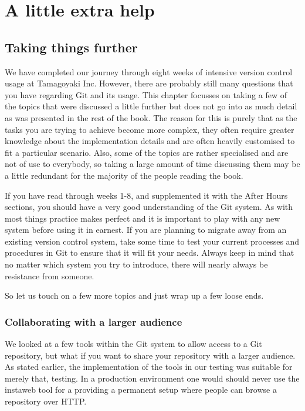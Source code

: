 \cleardoublepage
\chapter{A little extra help}
\section{Taking things further}
We have completed our journey through eight weeks of intensive version control usage at Tamagoyaki Inc.
However, there are probably still many questions that you have regarding Git and its usage.
This chapter focusses on taking a few of the topics that were discussed a little further but does not go into as much detail as was presented in the rest of the book.
The reason for this is purely that as the tasks you are trying to achieve become more complex, they often require greater knowledge about the implementation details
and are often heavily customised to fit a particular scenario.
Also, some of the topics are rather specialised and are not of use to everybody, so taking a large amount of time discussing them may be a little redundant for the majority of the people reading the book.

If you have read through weeks 1-8, and supplemented it with the After Hours sections, you should have a very good understanding of the Git system.
As with most things practice makes perfect and it is important to play with any new system before using it in earnest.
If you are planning to migrate away from an existing version control system, take some time to test your current processes and procedures in Git to ensure that it will fit your needs.
Always keep in mind that no matter which system you try to introduce, there will nearly always be resistance from someone.

So let us touch on a few more topics and just wrap up a few loose ends.

\subsection{Collaborating with a larger audience}
We looked at a few tools within the Git system to allow access to a Git repository, but what if you want to share your repository with a larger audience.
As stated earlier, the implementation of the tools in our testing was suitable for merely that, testing.
In a production environment one would should never use the instaweb tool for a providing a permanent setup where people can browse a repository over HTTP.

